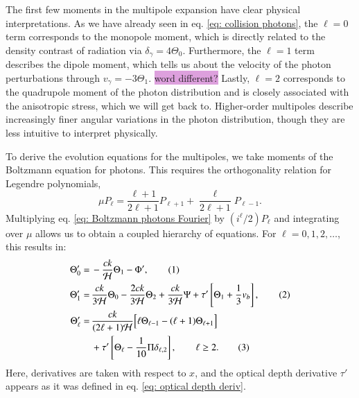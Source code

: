 \documentclass{aa}
\newcommand\numberthis{\addtocounter{equation}{1}\tag{\theequation}}
\numberwithin{equation}{section}
\numberwithin{table}{section}
\numberwithin{figure}{section}
\begin{document}
The first few moments in the multipole expansion have clear physical interpretations. As we have already seen in eq. \eqref{eq: collision photons}, the $\ell=0$ term corresponds to the monopole moment, which is directly related to the density contrast of radiation via $\delta_\gamma = 4\Theta_0$. Furthermore, the $\ell=1$ term describes the dipole moment, which tells us about the velocity of the photon perturbations through $v_\gamma = -3\Theta_1$. \colorbox{Plum}{word different?} Lastly, $\ell=2$ corresponds to the quadrupole moment of the photon distribution and is closely associated with the anisotropic stress, which we will get back to. Higher-order multipoles describe increasingly finer angular variations in the photon distribution, though they are less intuitive to interpret physically. 

To derive the evolution equations for the multipoles, we take moments of the Boltzmann equation for photons. This requires the orthogonality relation for Legendre polynomials,
\begin{equation}
  \mu P_\ell = \frac{\ell+1}{2\ell+1} P_{\ell+1} + \frac{\ell}{2\ell+1} P_{\ell-1}. 
\end{equation}
Multiplying eq. \eqref{eq: Boltzmann photons Fourier} by $(i^\ell/2) P_\ell$ and integrating over $\mu$ allows us to obtain a coupled hierarchy of equations. For $\ell = 0,1,2,\ldots$, this results in:
\begin{align*} 
  \Theta_0' =\, &-\frac{ck}{\mathcal{H}} \Theta_1 - \Phi', \numberthis \label{eq: monopole} \\ 
  \Theta_1' =\, &\frac{ck}{3\mathcal{H}} \Theta_0 - \frac{2ck}{3\mathcal{H}} \Theta_2 + \frac{ck}{3\mathcal{H}} \Psi + \tau' \left[ \Theta_1 + \frac{1}{3} v_b \right], \numberthis \label{eq: dipole} \\
  \Theta_\ell' =\, &\frac{c k}{(2\ell+1) \mathcal{H}} \Big[ \ell \Theta_{\ell-1} - (\ell+1) \Theta_{\ell+1} \Big] \\
  &+ \tau' \left[ \Theta_\ell - \frac{1}{10} \Pi \delta_{\ell,2} \right], \qquad \ell \geq 2. \numberthis 
\end{align*}
Here, derivatives are taken with respect to $x$, and the optical depth derivative $\tau'$ appears as it was defined in eq. \eqref{eq: optical depth deriv}.
\end{document}
